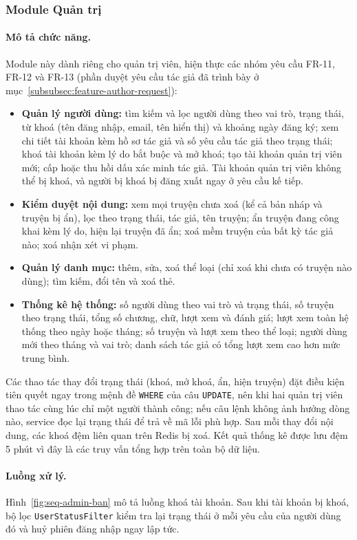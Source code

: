 \subsubsection{Module Quản trị}
\label{subsubsec:feature-admin}

\paragraph{Mô tả chức năng.} Module này dành riêng cho quản trị viên, hiện thực các nhóm yêu cầu FR-11, FR-12 và FR-13 (phần duyệt yêu cầu tác giả đã trình bày ở mục~\ref{subsubsec:feature-author-request}):
\begin{itemize}
    \item \textbf{Quản lý người dùng:} tìm kiếm và lọc người dùng theo vai trò, trạng thái, từ khoá (tên đăng nhập, email, tên hiển thị) và khoảng ngày đăng ký; xem chi tiết tài khoản kèm hồ sơ tác giả và số yêu cầu tác giả theo trạng thái; khoá tài khoản kèm lý do bắt buộc và mở khoá; tạo tài khoản quản trị viên mới; cấp hoặc thu hồi dấu xác minh tác giả. Tài khoản quản trị viên không thể bị khoá, và người bị khoá bị đăng xuất ngay ở yêu cầu kế tiếp.
    \item \textbf{Kiểm duyệt nội dung:} xem mọi truyện chưa xoá (kể cả bản nháp và truyện bị ẩn), lọc theo trạng thái, tác giả, tên truyện; ẩn truyện đang công khai kèm lý do, hiện lại truyện đã ẩn; xoá mềm truyện của bất kỳ tác giả nào; xoá nhận xét vi phạm.
    \item \textbf{Quản lý danh mục:} thêm, sửa, xoá thể loại (chỉ xoá khi chưa có truyện nào dùng); tìm kiếm, đổi tên và xoá thẻ.
    \item \textbf{Thống kê hệ thống:} số người dùng theo vai trò và trạng thái, số truyện theo trạng thái, tổng số chương, chữ, lượt xem và đánh giá; lượt xem toàn hệ thống theo ngày hoặc tháng; số truyện và lượt xem theo thể loại; người dùng mới theo tháng và vai trò; danh sách tác giả có tổng lượt xem cao hơn mức trung bình.
\end{itemize}
Các thao tác thay đổi trạng thái (khoá, mở khoá, ẩn, hiện truyện) đặt điều kiện tiên quyết ngay trong mệnh đề \texttt{WHERE} của câu \texttt{UPDATE}, nên khi hai quản trị viên thao tác cùng lúc chỉ một người thành công; nếu câu lệnh không ảnh hưởng dòng nào, service đọc lại trạng thái để trả về mã lỗi phù hợp. Sau mỗi thay đổi nội dung, các khoá đệm liên quan trên Redis bị xoá. Kết quả thống kê được lưu đệm 5 phút vì đây là các truy vấn tổng hợp trên toàn bộ dữ liệu.

\paragraph{Luồng xử lý.} Hình~\ref{fig:seq-admin-ban} mô tả luồng khoá tài khoản. Sau khi tài khoản bị khoá, bộ lọc \texttt{UserStatusFilter} kiểm tra lại trạng thái ở mỗi yêu cầu của người dùng đó và huỷ phiên đăng nhập ngay lập tức.

